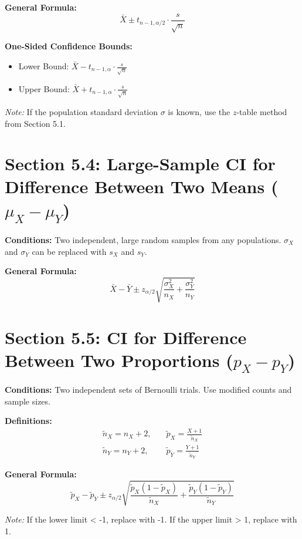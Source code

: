 \documentclass[11pt]{article}
\begin{document}
\textbf{General Formula:}
\[\bar{X} \pm t_{n-1, \alpha/2} \cdot \frac{s}{\sqrt{n}}\]

\textbf{One-Sided Confidence Bounds:}
\begin{itemize}[nosep]
    \item Lower Bound: $\bar{X} - t_{n-1, \alpha} \cdot \frac{s}{\sqrt{n}}$
    \item Upper Bound: $\bar{X} + t_{n-1, \alpha} \cdot \frac{s}{\sqrt{n}}$
\end{itemize}

\textit{Note:} If the population standard deviation $\sigma$ is known, use the $z$-table method from Section 5.1.

\section*{Section 5.4: Large-Sample CI for Difference Between Two Means ($\mu_X - \mu_Y$)}
\textbf{Conditions:} Two independent, large random samples from any populations. $\sigma_X$ and $\sigma_Y$ can be replaced with $s_X$ and $s_Y$.

\textbf{General Formula:}
\[\bar{X} - \bar{Y} \pm z_{\alpha/2} \sqrt{\frac{\sigma_X^2}{n_X} + \frac{\sigma_Y^2}{n_Y}}\]

\section*{Section 5.5: CI for Difference Between Two Proportions ($p_X - p_Y$)}
\textbf{Conditions:} Two independent sets of Bernoulli trials. Use modified counts and sample sizes.

\textbf{Definitions:}
\begin{align*}
    \tilde{n}_X = n_X + 2, &\quad \tilde{p}_X = \frac{X + 1}{\tilde{n}_X} \\
    \tilde{n}_Y = n_Y + 2, &\quad \tilde{p}_Y = \frac{Y + 1}{\tilde{n}_Y}
\end{align*}

\textbf{General Formula:}
\[\tilde{p}_X - \tilde{p}_Y \pm z_{\alpha/2} \sqrt{\frac{\tilde{p}_X(1 - \tilde{p}_X)}{\tilde{n}_X} + \frac{\tilde{p}_Y(1 - \tilde{p}_Y)}{\tilde{n}_Y}}\]

\textit{Note:} If the lower limit < -1, replace with -1. If the upper limit > 1, replace with 1.

\end{document}
